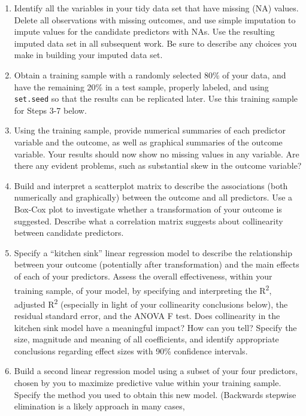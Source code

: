 \documentclass[]{book}
\providecommand{\tightlist}{%
  \setlength{\itemsep}{0pt}\setlength{\parskip}{0pt}}
\theoremstyle{definition}
\theoremstyle{definition}
\theoremstyle{definition}
\theoremstyle{remark}
\begin{document}
\begin{enumerate}
\def\labelenumi{\arabic{enumi}.}
\tightlist
\item
  Identify all the variables in your tidy data set that have missing
  (NA) values. Delete all observations with missing outcomes, and use
  simple imputation to impute values for the candidate predictors with
  NAs. Use the resulting imputed data set in all subsequent work. Be
  sure to describe any choices you make in building your imputed data
  set.
\item
  Obtain a training sample with a randomly selected 80\% of your data,
  and have the remaining 20\% in a test sample, properly labeled, and
  using \texttt{set.seed} so that the results can be replicated later.
  Use this training sample for Steps 3-7 below.
\item
  Using the training sample, provide numerical summaries of each
  predictor variable and the outcome, as well as graphical summaries of
  the outcome variable. Your results should now show no missing values
  in any variable. Are there any evident problems, such as substantial
  skew in the outcome variable?
\item
  Build and interpret a scatterplot matrix to describe the associations
  (both numerically and graphically) between the outcome and all
  predictors. Use a Box-Cox plot to investigate whether a transformation
  of your outcome is suggested. Describe what a correlation matrix
  suggests about collinearity between candidate predictors.
\item
  Specify a ``kitchen sink'' linear regression model to describe the
  relationship between your outcome (potentially after transformation)
  and the main effects of each of your predictors. Assess the overall
  effectiveness, within your training sample, of your model, by
  specifying and interpreting the R\textsuperscript{2}, adjusted
  R\textsuperscript{2} (especially in light of your collinearity
  conclusions below), the residual standard error, and the ANOVA F test.
  Does collinearity in the kitchen sink model have a meaningful impact?
  How can you tell? Specify the size, magnitude and meaning of all
  coefficients, and identify appropriate conclusions regarding effect
  sizes with 90\% confidence intervals.
\item
  Build a second linear regression model using a subset of your four
  predictors, chosen by you to maximize predictive value within your
  training sample. Specify the method you used to obtain this new model.
  (Backwards stepwise elimination is a likely approach in many cases,

\end{enumerate}
\end{document}
